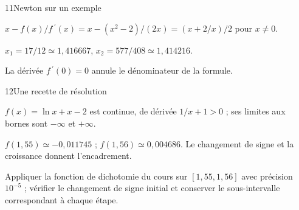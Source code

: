\begin{corrige}{11}{Newton sur un exemple}
\begin{questions}
\item $x-f(x)/f\,\!^{\prime}(x)=x-(x^2-2)/(2x)=(x+2/x)/2$ pour $x\ne0$.
\item $x_1=17/12\simeq1{,}416667$, $x_2=577/408\simeq1{,}414216$.
\item La dérivée $f\,\!^{\prime}(0)=0$ annule le dénominateur de la formule.
\end{questions}
\end{corrige}
\begin{corrige}{12}{Une recette de résolution}
\begin{questions}
\item $f(x)=\ln x+x-2$ est continue, de dérivée $1/x+1>0$ ; ses limites aux bornes sont $-\infty$ et $+\infty$.
\item $f(1{,}55)\simeq-0{,}011745$ ; $f(1{,}56)\simeq0{,}004686$. Le changement de signe et la croissance donnent l’encadrement.
\item Appliquer la fonction de dichotomie du cours sur $[1{,}55,1{,}56]$ avec précision $10^{-5}$ ; vérifier le changement de signe initial et conserver le sous-intervalle correspondant à chaque étape.
\end{questions}
\end{corrige}
